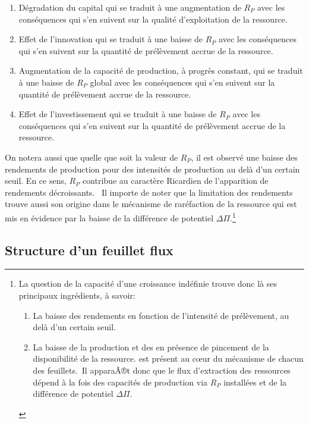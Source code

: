 \documentclass[12pt,a4paper]{article}%
\begin{document}
\begin{enumerate}
\item Dégradation du capital qui se traduit à une augmentation de $R_{P}$
avec les conséquences qui s'en suivent sur la qualité d'exploitation de la ressource.

\item Effet de l'innovation qui se traduit à une baisse de $R_{P}$ avec
les conséquences qui s'en suivent sur la quantité de prélèvement accrue de
la ressource.

\item Augmentation de la capacité de production, à progrès constant,
qui se traduit à une baisse de $R_{P}$ global avec les conséquences qui
s'en suivent sur la quantité de prélèvement accrue de la ressource.

\item Effet de l'investissement qui se traduit à une baisse de $R_{P}$
avec les conséquences qui s'en suivent sur la quantité de prélèvement
accrue de la ressource.
\end{enumerate}

On notera aussi que quelle que soit la valeur de $R_{P}$, il est observé une
baisse des rendements de production pour des intensités de production au
delà d'un certain seuil. En ce sens, $R_{P}$ contribue au caractère
Ricardien de l'apparition de rendements décroissants. \ Il importe de noter
que la limitation des rendements trouve aussi son origine dans le mécanisme de
raréfaction de la ressource qui est mis en évidence par la baisse de la
différence de potentiel $\Delta\Pi$.\footnote{La question de la
capacité d'une croissance indéfinie trouve donc là ses principaux ingrédients,
à savoir:
\par
\begin{enumerate}
\item La baisse des rendements en fonction de l'intensité de prélèvement, au
delà d'un certain seuil.
\par
\item La baisse de la production et des en présence de pincement de la
disponibilité de la ressource. est présent au c\oe ur du mécanisme de chacun
des feuillets.\ Il apparaÃ®t donc que le flux d'extraction des ressources
dépend à la fois des capacités de production via $R_{P}$ installées et de la
différence de potentiel $\Delta\Pi$.
\end{enumerate}
}

\subsection{Structure d'un feuillet flux}
\end{document}
